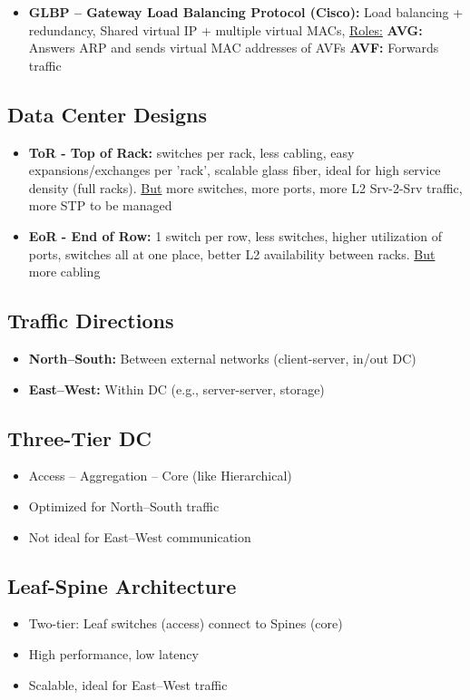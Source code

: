 \begin{multicols*}{5}
\begin{itemize}
			\item \textbf{GLBP – Gateway Load Balancing Protocol (Cisco):} Load balancing + redundancy, Shared virtual IP + multiple virtual MACs, \underline{ Roles:} \textbf{AVG:} Answers ARP and sends virtual MAC addresses of AVFs \textbf{AVF:} Forwards traffic
			
		\end{itemize}
		
		\subsection{Data Center Designs}
		\begin{itemize}
			\item \textbf{ToR - Top of Rack:} switches per rack, less cabling, easy expansions/exchanges per 'rack', scalable glass fiber, ideal for high service density (full racks). \underline{But} more switches, more ports, more L2 Srv-2-Srv traffic, more STP to be managed
			\item \textbf{EoR - End of Row:} 1 switch per row, less switches, higher utilization of ports, switches all at one place, better L2 availability between racks. \underline{But} more cabling
		\end{itemize}
		
		\subsection{Traffic Directions}
		\begin{itemize}
			\item \textbf{North–South:} Between external networks (client-server, in/out DC)
			\item \textbf{East–West:} Within DC (e.g., server-server, storage)
		\end{itemize}
		
		\subsection{Three-Tier DC}
		\begin{itemize}
			\item Access – Aggregation – Core (like Hierarchical)
			\item Optimized for North–South traffic
			\item Not ideal for East–West communication
		\end{itemize}
		
		\subsection{Leaf-Spine Architecture}
		\begin{itemize}
			\item Two-tier: Leaf switches (access) connect to Spines (core)
			\item High performance, low latency
			\item Scalable, ideal for East–West traffic
		\end{itemize}

\end{multicols*}
